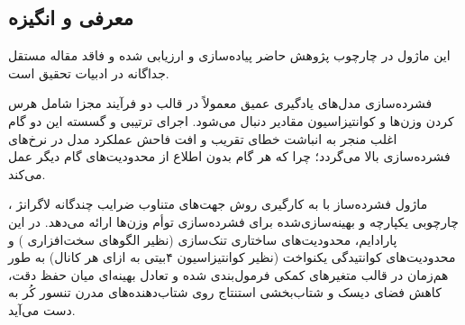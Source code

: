 \subsection{معرفی و انگیزه}
این ماژول در چارچوب پژوهش حاضر پیاده‌سازی و ارزیابی شده و فاقد مقاله مستقل جداگانه در ادبیات تحقیق است.

فشرده‌سازی مدل‌های یادگیری عمیق معمولاً در قالب دو فرآیند مجزا شامل هرس کردن وزن‌ها  و کوانتیزاسیون مقادیر  دنبال می‌شود. اجرای ترتیبی و گسسته این دو گام اغلب منجر به انباشت خطای تقریب و افت فاحش عملکرد مدل در نرخ‌های فشرده‌سازی بالا می‌گردد؛ چرا که هر گام بدون اطلاع از محدودیت‌های گام دیگر عمل می‌کند.

ماژول فشرده‌ساز  با به کارگیری روش جهت‌های متناوب ضرایب چندگانه لاگرانژ ، چارچوبی یکپارچه و بهینه‌سازی‌شده برای فشرده‌سازی توأم وزن‌ها ارائه می‌دهد. در این پارادایم، محدودیت‌های ساختاری تنک‌سازی (نظیر الگوهای سخت‌افزاری ) و محدودیت‌های کوانتیدگی یکنواخت (نظیر کوانتیزاسیون ۴بیتی به ازای هر کانال) به طور هم‌زمان در قالب متغیرهای کمکی فرمول‌بندی شده و تعادل بهینه‌ای میان حفظ دقت، کاهش فضای دیسک و شتاب‌بخشی استنتاج روی شتاب‌دهنده‌های مدرن تنسور کُر  به دست می‌آید.
